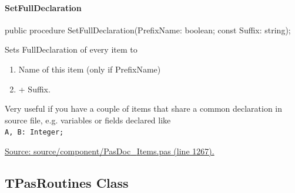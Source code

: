 \documentclass{report}
\newif\ifpdf
\begin{document}
\paragraph*{SetFullDeclaration}\hspace*{\fill}

\label{PasDoc_Items.TPasItems-SetFullDeclaration}
\begin{list}{}{
\setlength{\itemindent}{0cm}
\setlength{\listparindent}{0cm}
\setlength{\leftmargin}{\evensidemargin}
\addtolength{\leftmargin}{\tmplength}
\settowidth{\labelsep}{X}
\addtolength{\leftmargin}{\labelsep}
\setlength{\labelwidth}{\tmplength}
}
\item[\textbf{Declaration}\hfill]
\ifpdf
\begin{flushleft}
\fi
\begin{ttfamily}
public procedure SetFullDeclaration(PrefixName: boolean; const Suffix: string);\end{ttfamily}

\ifpdf
\end{flushleft}
\fi

\par
\item[\textbf{Description}]
Sets FullDeclaration of every item to \begin{enumerate}
\setcounter{enumi}{0} \setcounter{enumii}{0} \setcounter{enumiii}{0} \setcounter{enumiv}{0} 
\item Name of this item (only if PrefixName)
\setcounter{enumi}{1} \setcounter{enumii}{1} \setcounter{enumiii}{1} \setcounter{enumiv}{1} 
\item + Suffix.
\end{enumerate} Very useful if you have a couple of items that share a common declaration in source file, e.g. variables or fields declared like \texttt{\\\nopagebreak[3]
A,~B:~Integer;\\
}\par
\href{https://github.com/pasdoc/pasdoc/blob/master/source/component/PasDoc_Items.pas#L1267}{Source: source/component/PasDoc{\_}Items.pas (line 1267).}

\end{list}
\ifpdf
\subsection*{\large{\textbf{TPasRoutines Class}}\normalsize\hspace{1ex}\hrulefill}
\else
\end{document}
